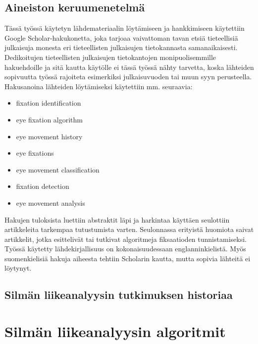 \subsection{Aineiston keruumenetelmä}
Tässä työssä käytetyn lähdemateriaalin löytämiseen ja hankkimiseen käytettiin Google Scholar-hakukonetta, joka tarjoaa vaivattoman tavan etsiä tieteellisiä julkaisuja monesta eri tieteellisten julkaisujen tietokannasta samanaikaisesti. Dedikoitujen tieteellisten julkaisujen tietokantojen monipuolisemmille hakuehdoille ja sitä kautta käytölle ei tässä työssä nähty tarvetta, koska lähteiden sopivuutta työssä rajoiteta esimerkiksi julkaisuvuoden tai muun syyn perusteella.
Hakusanoina lähteiden löytämiseksi käytettiin mm. seuraavia:

\begin{itemize}
	\item fixation identification
	\item eye fixation algorithm
	\item eye movement history
	\item eye fixations
	\item eye movement classification
	\item fixation detection
	\item eye movement analysis
\end{itemize}

Hakujen tuloksista luettiin abstraktit läpi ja harkintaa käyttäen seulottiin artikkeleita tarkempaa tutustumista varten. Seulonnassa erityistä huomiota saivat artikkelit, jotka esittelivät tai tutkivat algoritmeja fiksaatioden tunnistamiseksi. Työssä käytetty lähdekirjallisuus on kokonaisuudessaan englanninkielistä. Myös suomenkielisiä hakuja aiheesta tehtiin Scholarin kautta, mutta sopivia lähteitä ei löytynyt.


\subsection{Silmän liikeanalyysin tutkimuksen historiaa}


\section{Silmän liikeanalyysin algoritmit}
